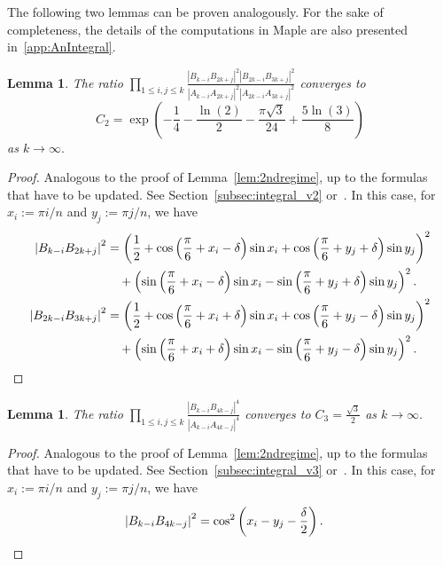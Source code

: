 \documentclass{article}
\newtheorem{lem}[thr]{Lemma}
\theoremstyle{definition}
\let\le\leqslant
\newcommand{\abs}[1]{\left|#1\right|}
\begin{document}
The following two lemmas can be proven analogously. For the sake of completeness, the details of the computations in Maple are also presented in~\cref{app:AnIntegral}.

\begin{lem}\label{lem:3rdregime}
    The ratio $\prod_{ 1 \le i,j \le k } \frac{\abs{B_{k-i}B_{2k+j}}^2\abs{B_{2k-i}B_{3k+j}}^2}{\abs{A_{k-i}A_{2k+j}}^2\abs{A_{2k-i}A_{3k+j}}^2}$ converges to \[C_2=\exp\left(-\frac{1}{4}-\frac{\ln(2)}{2}-\frac{\pi\sqrt3}{24}+\frac{5 \ln (3)}{8}\right)\] as $k \to \infty.$
\end{lem}

\begin{proof}
    Analogous to the proof of Lemma~\ref{lem:2ndregime}, up to the formulas that have to be updated. See Section~\ref{subsec:integral_v2} or~\cite[\texttt{EP1045_2ndregime}]{githubRepo}.
    In this case, for $x_i:=\pi i/n$ and $y_j:=\pi j/n$, we have
    \begin{align*}\abs{B_{k-i}B_{2k+j}}^2
    &=
    \left(
    \frac12
    +\cos \left(\frac{\pi}{6}+x_i-\delta\right)\sin x_i
    +\cos \left(\frac{\pi}{6}+y_j+\delta\right)\sin y_j
    \right)^2 \\
    &\quad+
    \left(
    \sin \left(\frac{\pi}{6}+x_i-\delta\right)\sin x_i
    -\sin \left(\frac{\pi}{6}+y_j+\delta\right)\sin y_j
    \right)^2.\\
    \abs{B_{2k-i}B_{3k+j}}^2
    &=
    \left(
    \frac12
    +\cos \left(\frac{\pi}{6}+x_i+\delta\right)\sin x_i
    +\cos \left(\frac{\pi}{6}+y_j-\delta\right)\sin y_j
    \right)^2 \\
    &\quad+
    \left(
    \sin \left(\frac{\pi}{6}+x_i+\delta\right)\sin x_i
    -\sin \left(\frac{\pi}{6}+y_j-\delta\right)\sin y_j
    \right)^2.
    \qedhere\end{align*}
\end{proof}


\begin{lem}\label{lem:4thregime}
    The ratio $\prod_{ 1 \le i,j \le k } \frac{\abs{B_{k-i}B_{4k-j}}^4}{\abs{A_{k-i}A_{4k-j}}^4}$ converges to $C_3=\frac{\sqrt 3}{2}$ as $k \to \infty.$
\end{lem}

\begin{proof}
    Analogous to the proof of Lemma~\ref{lem:2ndregime}, up to the formulas that have to be updated. See Section~\ref{subsec:integral_v3} or~\cite[\texttt{EP1045_3rdregime}]{githubRepo}.
    In this case, for $x_i:=\pi i/n$ and $y_j:=\pi j/n$, we have
    \begin{align*}
    \abs{B_{k-i}B_{4k-j}}^2&=\cos^2 \left(x_i-y_j-\frac{\delta}{2}\right).  \qedhere\end{align*}
\end{proof}
\end{document}
